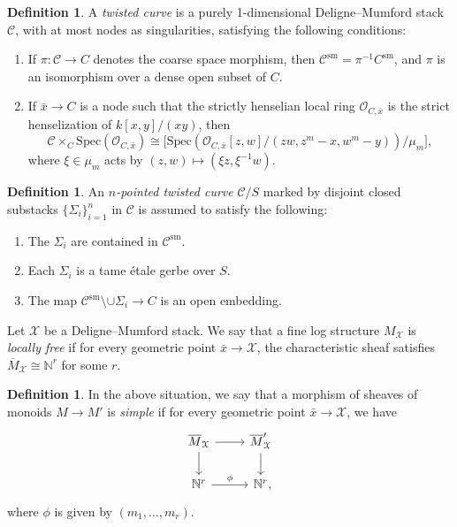 \documentclass[11pt]{amsart}
\numberwithin{equation}{section}
\theoremstyle{definition}
\newtheorem{definition}[theorem]{Definition}
\theoremstyle{remark}
\newcommand{\calO}{\mathcal O}
\newcommand{\calX}{\mathcal X}
\newcommand{\calC}{\mathcal C}
\newcommand{\Spec}{\mathrm{Spec}}
\newcommand{\sm}{\mathrm{sm}}
\begin{document}
\begin{definition}
A \emph{twisted curve} is a purely 1-dimensional Deligne--Mumford stack $\calC$, with at most nodes as singularities, satisfying the following conditions:
\begin{enumerate}
    \item If $\pi\colon  \calC \to C$ denotes the coarse space morphism, then $\calC^{\sm} = \pi^{-1}C^{\sm}$, and $\pi$ is an isomorphism over a dense open subset of $C$. 
    \item If $\bar{x} \to C$ is a node such that the strictly henselian local ring $\calO_{C, \bar{x}}$  is the strict henselization of $k[x,y]/(xy)$, then
    \[ \calC \times_C \Spec \left(\calO_{C, \bar{x}}\right) \cong \bigg[\Spec \left(\calO_{C, \bar{x}}[z,w]/(zw, z^m-x, w^m-y)\right) / \mu_m\bigg],\]
    where $\xi \in \mu_m$ acts by $(z,w) \mapsto (\xi z, \xi^{-1}w)$.
\end{enumerate}
\end{definition}

\begin{definition}
An \emph{$n$-pointed twisted curve} $\calC/S$ marked by disjoint closed substacks $\{ \Sigma_i\}_{i=1}^n$ in $\calC$ is assumed to satisfy the following:
\begin{enumerate}
    \item The $\Sigma_i$ are contained in $\calC^{\sm}$. 
    \item Each $\Sigma_i$ is a tame \'etale gerbe over $S$.
    \item The map $\calC^{\sm} \setminus \cup \Sigma_i \to C$ is an open embedding.
\end{enumerate}
\end{definition}

Let $\calX$ be a Deligne–Mumford stack. We say that a fine log structure $M_{\calX}$ is \emph{locally free} if for every geometric point $\bar{x} \to \calX$, the characteristic sheaf satisfies $\overline{M}_{\calX} \cong \mathbb{N}^r$ for some $r$. 

\begin{definition}\label{def:simple}
In the above situation, we say that a morphism of sheaves of monoids $M \to M'$ is \emph{simple} if for every geometric point $\bar{x} \to \calX$, we have
\[\begin{tikzcd}
    \overline{M}_\calX \ar{r} \ar{d} & \overline{M}'_\calX \ar{d} \\
    \mathbb{N}^r \ar[r, "\phi"] & \mathbb{N}^r\rlap{,}
\end{tikzcd}\] 
where $\phi$ is given by $(m_1, \dots, m_r)$.
\end{definition}
\end{document}
